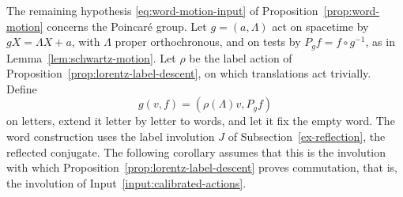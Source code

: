The remaining hypothesis \eqref{eq:word-motion-input} of
Proposition~\ref{prop:word-motion} concerns the Poincar\'e group. Let
$g=(a,\Lambda)$ act on spacetime by $gX=\Lambda X+a$, with $\Lambda$
proper orthochronous, and on tests by $P_gf=f\circ g^{-1}$, as in
Lemma~\ref{lem:schwartz-motion}. Let $\rho$ be the label action of
Proposition~\ref{prop:lorentz-label-descent}, on which translations act
trivially. Define
\[
 g(v,f)=(\rho(\Lambda)v,P_gf)
\]
on letters, extend it letter by letter to words, and let it fix the empty
word. The word construction uses the label involution $J$ of
Subsection~\ref{ex-reflection}, the reflected conjugate. The following
corollary assumes that this is the involution with which
Proposition~\ref{prop:lorentz-label-descent} proves commutation, that is,
the involution of Input~\ref{input:calibrated-actions}.

